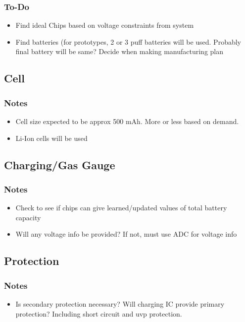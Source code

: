 \documentclass{article}
\begin{document}
\subsubsection{To-Do}
\begin{itemize}
    \item Find ideal Chips based on voltage constraints from system
    \item Find batteries (for prototypes, 2 or 3 puff batteries will be used. Probably final battery will be same? Decide when making manufacturing plan
\end{itemize}

\subsection{Cell}

\subsubsection{Notes}
\begin{itemize}
    \item Cell size expected to be approx 500 mAh. More or less based on demand.
    \item Li-Ion cells will be used
\end{itemize}


\subsection{Charging/Gas Gauge}
\subsubsection{Notes}
\begin{itemize}
    \item Check to see if chips can give learned/updated values of total battery capacity
    \item Will any voltage info be provided? If not, must use ADC for voltage info
\end{itemize}


\subsection{Protection}
\subsubsection{Notes}
\begin{itemize}
    \item Is secondary protection necessary? Will charging IC provide primary protection? Including short circuit and uvp protection.
\end{itemize}
\end{document}
